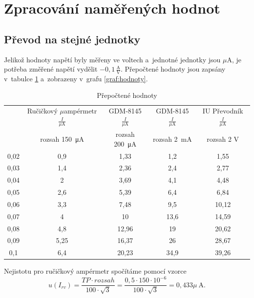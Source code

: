 \documentclass[a4paper,12pt]{article}   %
\newcommand{\tmu}{$\mu$}
\begin{document}
\section{Zpracování naměřených hodnot}

\subsection{Převod na stejné jednotky}
Jelikož hodnoty napětí byly měřeny ve voltech a~jednotné jednotky jsou \tmu A, je potřeba změřené napětí vydělit $-0,1\,\frac{\textrm{A}}{\textrm{V}}$. Přepočtené hodnoty jsou zapsány v~tabulce \ref{tab:prepocteno} a~zobrazeny v~grafu \ref{graf:hodnoty}.

\begin{table}[h!]
    \centering
    \begin{tabular}{|c|c|c|c|c|}
        \hline
        \rule{0pt}{2.5ex}
        \multirow{2}{*}{Napětí na děliči $\frac{U}{\textrm{V}}$}& Ručičkový \tmu ampérmetr$\frac{I}{\mu\textrm{A}}$ 	&GDM-8145 $\frac{I}{\mu\textrm{A}}$	&GDM-8145 $\frac{I}{\mu\textrm{A}}$	&IU Převodník $\frac{I}{\mu\textrm{A}}$  \\[.7ex]
        & rozsah  150~μA & rozsah 200~μA & rozsah  2~mA & rozsah  2 V\\\hline\hline
        0,02    &0,9    &1,33   &1,2    &1,55   \\\hline
        0,03    &1,4    &2,36   &2,4    &2,77   \\\hline
        0,04    &2      &3,69   &4,1    &4,48   \\\hline
        0,05    &2,6    &5,39   &6,4    &6,84   \\\hline
        0,06    &3,3    &7,48   &9,5    &10,12  \\\hline
        0,07    &4      &10     &13,6   &14,59  \\\hline
        0,08    &4,8    &12,96  &19     &20,62  \\\hline
        0,09    &5,25   &16,37  &26     &28,67  \\\hline
        0,1     &6,4    &20,23  &34,9   &39,26  \\\hline
    \end{tabular}
    \caption{Přepočtené hodnoty}
    \label{tab:prepocteno}
\end{table}

Nejistotu pro ručičkový ampérmetr spočítáme pomocí vzorce
\begin{equation}
    u(I_{rv}) = \frac{TP\cdot rozsah}{100\cdot\sqrt{3}} = \frac{0,5\cdot 150\cdot 10^{-6}}{100\cdot\sqrt{3}} = 0,433 \mu ~\textrm{A.}
\end{equation}
\end{document}
